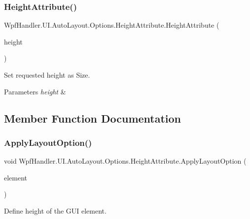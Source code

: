 \subsubsection{\texorpdfstring{Height\+Attribute()}{HeightAttribute()}\hspace{0.1cm}{\footnotesize\ttfamily [2/2]}}
{\footnotesize\ttfamily Wpf\+Handler.\+U\+I.\+Auto\+Layout.\+Options.\+Height\+Attribute.\+Height\+Attribute (\begin{DoxyParamCaption}\item[{double}]{height }\end{DoxyParamCaption})}



Set requested height as Size. 


\begin{DoxyParams}{Parameters}
{\em height} & \\
\hline
\end{DoxyParams}


\subsection{Member Function Documentation}
\mbox{\label{class_wpf_handler_1_1_u_i_1_1_auto_layout_1_1_options_1_1_height_attribute_a221d69c339ceb5cd3e16d8e59f216cc9}} 
\subsubsection{\texorpdfstring{Apply\+Layout\+Option()}{ApplyLayoutOption()}}
{\footnotesize\ttfamily void Wpf\+Handler.\+U\+I.\+Auto\+Layout.\+Options.\+Height\+Attribute.\+Apply\+Layout\+Option (\begin{DoxyParamCaption}\item[{Framework\+Element}]{element }\end{DoxyParamCaption})}



Define height of the G\+UI element. 



